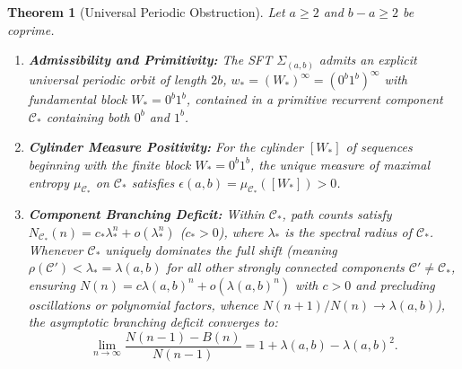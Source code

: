 \documentclass[11pt,reqno]{amsart}
\theoremstyle{plain}
\newtheorem{theorem}{Theorem}[section]
\theoremstyle{definition}
\theoremstyle{remark}
\begin{document}
\begin{theorem}[Universal Periodic Obstruction]\label{thm:periodic_obstruction}
Let $a \ge 2$ and $b - a \ge 2$ be coprime.
\begin{enumerate}
    \item \textbf{Admissibility and Primitivity:} The SFT $\Sigma_{(a, b)}$ admits an explicit universal periodic orbit of length $2b$, $w_* = (W_*)^\infty = (0^b 1^b)^\infty$ with fundamental block $W_* = 0^b 1^b$, contained in a primitive recurrent component $\mathcal{C}_*$ containing both $0^b$ and $1^b$.
    \item \textbf{Cylinder Measure Positivity:} For the cylinder $[W_*]$ of sequences beginning with the finite block $W_* = 0^b 1^b$, the unique measure of maximal entropy $\mu_{\mathcal{C}_*}$ on $\mathcal{C}_*$ satisfies $\epsilon(a, b) = \mu_{\mathcal{C}_*}([W_*]) > 0$.
    \item \textbf{Component Branching Deficit:} Within $\mathcal{C}_*$, path counts satisfy $N_{\mathcal{C}_*}(n) = c_* \lambda_*^n + o(\lambda_*^n)$ ($c_* > 0$), where $\lambda_*$ is the spectral radius of $\mathcal{C}_*$. Whenever $\mathcal{C}_*$ uniquely dominates the full shift (meaning $\rho(\mathcal{C}') < \lambda_* = \lambda(a, b)$ for all other strongly connected components $\mathcal{C}' \ne \mathcal{C}_*$, ensuring $N(n) = c \lambda(a, b)^n + o(\lambda(a, b)^n)$ with $c > 0$ and precluding oscillations or polynomial factors, whence $N(n+1)/N(n) \to \lambda(a, b)$), the asymptotic branching deficit converges to:
    \begin{equation}
    \lim_{n \to \infty} \frac{N(n-1) - B(n)}{N(n-1)} = 1 + \lambda(a,b) - \lambda(a,b)^2 .
    \end{equation}
\end{enumerate}
\end{theorem}
\end{document}

